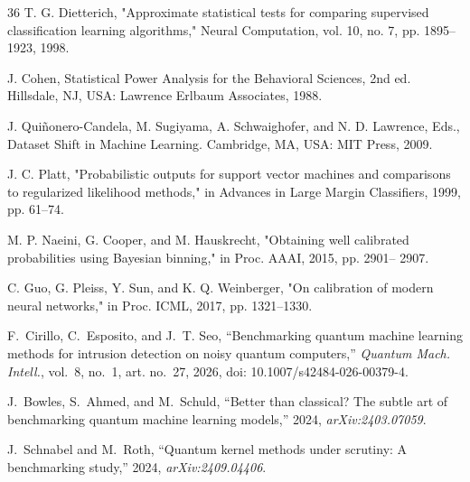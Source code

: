 \begin{thebibliography}{36}
T. G. Dietterich, "Approximate statistical tests for comparing supervised classification learning algorithms," Neural Computation, vol. 10, no. 7, pp. 1895--1923, 1998.

J. Cohen, Statistical Power Analysis for the Behavioral Sciences, 2nd ed. Hillsdale, NJ, USA: Lawrence Erlbaum Associates, 1988.

J. Qui\~nonero-Candela, M. Sugiyama, A. Schwaighofer, and N. D. Lawrence, Eds., Dataset Shift in Machine Learning. Cambridge, MA, USA: MIT Press, 2009.

J. C. Platt, "Probabilistic outputs for support vector machines and comparisons to regularized likelihood methods," in Advances in Large Margin Classifiers, 1999, pp. 61--74.

M. P. Naeini, G. Cooper, and M. Hauskrecht, "Obtaining well calibrated probabilities using Bayesian binning," in Proc. AAAI, 2015, pp. 2901-- 2907.

C. Guo, G. Pleiss, Y. Sun, and K. Q. Weinberger, "On calibration of modern neural networks," in Proc. ICML, 2017, pp. 1321--1330.


F.~Cirillo, C.~Esposito, and J.~T. Seo, ``Benchmarking quantum machine
learning methods for intrusion detection on noisy quantum computers,''
\emph{Quantum Mach. Intell.}, vol.~8, no.~1, art. no.~27, 2026,
doi: 10.1007/s42484-026-00379-4.

J.~Bowles, S.~Ahmed, and M.~Schuld, ``Better than classical? The subtle art of
benchmarking quantum machine learning models,'' 2024, \emph{arXiv:2403.07059}.

J.~Schnabel and M.~Roth, ``Quantum kernel methods under scrutiny: A benchmarking
study,'' 2024, \emph{arXiv:2409.04406}.


\end{thebibliography}
